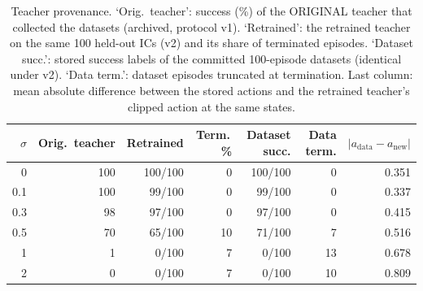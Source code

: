 \begin{table}[t]
\centering
\scriptsize
%
\begin{tabular}{rrrrrrr}
\toprule
$\sigma$ & Orig.\ teacher & Retrained & Term.\,\% & Dataset succ. & Data term. & $|a_{\mathrm{data}}-a_{\mathrm{new}}|$ \\
\midrule
0 & 100 & 100/100 & 0 & 100/100 & 0 & 0.351 \\
0.1 & 100 & 99/100 & 0 & 99/100 & 0 & 0.337 \\
0.3 & 98 & 97/100 & 0 & 97/100 & 0 & 0.415 \\
0.5 & 70 & 65/100 & 10 & 71/100 & 7 & 0.516 \\
1 & 1 & 0/100 & 7 & 0/100 & 13 & 0.678 \\
2 & 0 & 0/100 & 7 & 0/100 & 10 & 0.809 \\
\bottomrule
\end{tabular}
%
\caption{Teacher provenance. `Orig.\ teacher': success (\%) of the ORIGINAL teacher that collected the datasets (archived, protocol v1). `Retrained': the retrained teacher on the same 100 held-out ICs (v2) and its share of terminated episodes. `Dataset succ.': stored success labels of the committed 100-episode datasets (identical under v2). `Data term.': dataset episodes truncated at termination. Last column: mean absolute difference between the stored actions and the retrained teacher's clipped action at the same states.}
\label{tab:teacher}
\end{table}
